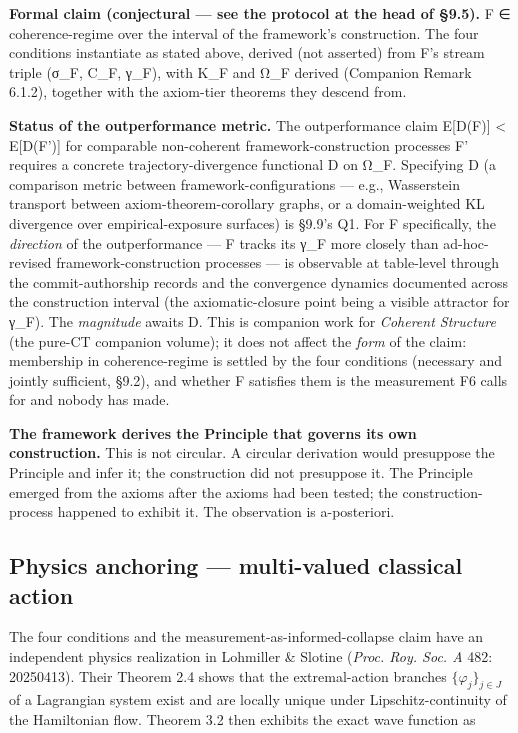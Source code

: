 \documentclass[11pt, openany]{book}
\begin{document}
\textbf{Formal claim (conjectural --- see the protocol at the head of §9.5).} F ∈ coherence-regime over the interval of the framework's construction. The four conditions instantiate as stated above, derived (not asserted) from F's stream triple (σ\_\allowbreak{}F, C\_\allowbreak{}F, γ\_\allowbreak{}F), with K\_\allowbreak{}F and Ω\_\allowbreak{}F derived (Companion Remark 6.1.2), together with the axiom-tier theorems they descend from.

\textbf{Status of the outperformance metric.} The outperformance claim E[D(F)] < E[D(F')] for comparable non-coherent framework-construction processes F' requires a concrete trajectory-divergence functional D on Ω\_\allowbreak{}F. Specifying D (a comparison metric between framework-configurations --- e.g., Wasserstein transport between axiom-theorem-corollary graphs, or a domain-weighted KL divergence over empirical-exposure surfaces) is §9.9's Q1. For F specifically, the \textit{direction} of the outperformance --- F tracks its γ\_\allowbreak{}F more closely than ad-hoc-revised framework-construction processes --- is observable at table-level through the commit-authorship records and the convergence dynamics documented across the construction interval (the axiomatic-closure point being a visible attractor for γ\_\allowbreak{}F). The \textit{magnitude} awaits D. This is companion work for \textit{Coherent Structure} (the pure-CT companion volume); it does not affect the \textit{form} of the claim: membership in coherence-regime is settled by the four conditions (necessary and jointly sufficient, §9.2), and whether F satisfies them is the measurement F6 calls for and nobody has made.

\textbf{The framework derives the Principle that governs its own construction.} This is not circular. A circular derivation would presuppose the Principle and infer it; the construction did not presuppose it. The Principle emerged from the axioms after the axioms had been tested; the construction-process happened to exhibit it. The observation is a-posteriori.

\subsection{Physics anchoring --- multi-valued classical action}

The four conditions and the measurement-as-informed-collapse claim have an independent physics realization in Lohmiller \& Slotine (\textit{Proc. Roy. Soc. A} 482: 20250413). Their Theorem 2.4 shows that the extremal-action branches $\{ \varphi_j \}_{j \in J}$ of a Lagrangian system exist and are locally unique under Lipschitz-continuity of the Hamiltonian flow. Theorem 3.2 then exhibits the exact wave function as
\end{document}
